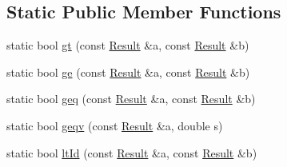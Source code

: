 \subsection*{Static Public Member Functions}
\begin{DoxyCompactItemize}
\item 
static bool \hyperlink{classDBoW2_1_1Result_a6af72ce2de8c7e1707550520d9c7e422}{gt} (const \hyperlink{classDBoW2_1_1Result}{Result} \&a, const \hyperlink{classDBoW2_1_1Result}{Result} \&b)
\item 
static bool \hyperlink{classDBoW2_1_1Result_ab24992db21ed95d77fa5fc040d45940b}{ge} (const \hyperlink{classDBoW2_1_1Result}{Result} \&a, const \hyperlink{classDBoW2_1_1Result}{Result} \&b)
\item 
static bool \hyperlink{classDBoW2_1_1Result_afe1567c5a010ebf492a558f60e0f7275}{geq} (const \hyperlink{classDBoW2_1_1Result}{Result} \&a, const \hyperlink{classDBoW2_1_1Result}{Result} \&b)
\item 
static bool \hyperlink{classDBoW2_1_1Result_a2cb32089cbe5dffaa5b60fb1b410a713}{geqv} (const \hyperlink{classDBoW2_1_1Result}{Result} \&a, double s)
\item 
static bool \hyperlink{classDBoW2_1_1Result_ac8b4e2a21806b48a042168936c44e6bd}{lt\+Id} (const \hyperlink{classDBoW2_1_1Result}{Result} \&a, const \hyperlink{classDBoW2_1_1Result}{Result} \&b)
\end{DoxyCompactItemize}
